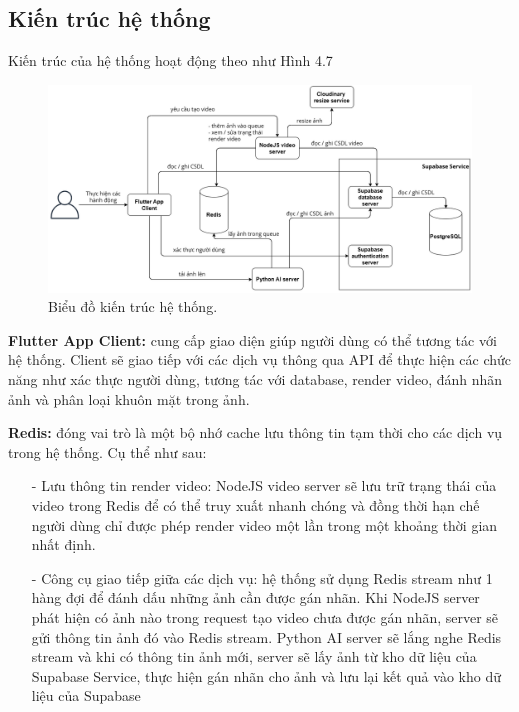 \subsection{Kiến trúc hệ thống}

Kiến trúc của hệ thống hoạt động theo như Hình 4.7

\begin{figure}[H]
    \centering  
    \includegraphics[width=1\textwidth]{figures/c4/4_1/architechture.png}
    \caption{Biểu đồ kiến trúc hệ thống.}
    \label{fig:architecture_diagram}
\end{figure}

\textbf{Flutter App Client:} cung cấp giao diện giúp người dùng có thể tương tác với hệ thống. Client sẽ giao tiếp với các dịch vụ thông qua API để thực hiện các chức năng như xác thực người dùng, tương tác với database, render video, đánh nhãn ảnh và phân loại khuôn mặt trong ảnh.

\textbf{Redis:} đóng vai trò là một bộ nhớ cache lưu thông tin tạm thời cho các dịch vụ trong hệ thống. Cụ thể như sau: 
\begin{itemize}
    \item[-] Lưu thông tin render video: NodeJS video server sẽ lưu trữ trạng thái của video trong Redis để có thể truy xuất nhanh chóng và đồng thời hạn chế người dùng chỉ được phép render video một lần trong một khoảng thời gian nhất định.
    \item[-] Công cụ giao tiếp giữa các dịch vụ: hệ thống sử dụng Redis stream như 1 hàng đợi để đánh dấu những ảnh cần được gán nhãn. Khi NodeJS server phát hiện có ảnh nào trong request tạo video chưa được gán nhãn, server sẽ gửi thông tin ảnh đó vào Redis stream. Python AI server sẽ lắng nghe Redis stream và khi có thông tin ảnh mới, server sẽ lấy ảnh từ kho dữ liệu của Supabase Service, thực hiện gán nhãn cho ảnh và lưu lại kết quả vào kho dữ liệu của Supabase 
\end{itemize}

